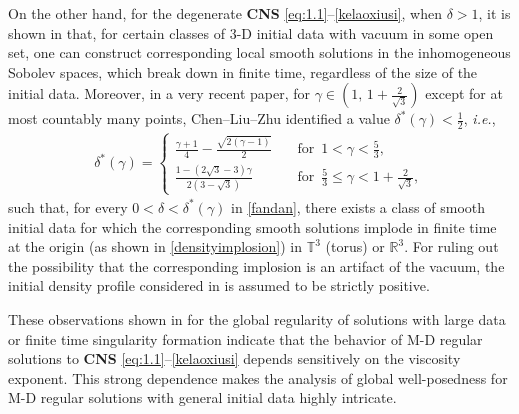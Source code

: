 \documentclass[11pt,reqno]{amsart}
\numberwithin{rk}{section}
\numberwithin{prop}{section}
\numberwithin{mydef}{section}
\numberwithin{lem}{section}
\numberwithin{equation}{section}
\numberwithin{thm}{section}
\begin{document}
On the other hand, for the degenerate \textbf{CNS} \eqref{eq:1.1}--\eqref{kelaoxiusi}, when $\delta>1$, it is shown in \cite{sz333} that,  for certain classes of 3-D initial data with vacuum in some open set, one can construct corresponding local smooth solutions in the inhomogeneous Sobolev spaces, which break down in finite time, regardless of the size of  the initial data. Moreover, in a very recent paper, for   $\gamma \in (1,\, 1+\frac{2}{\sqrt{3}})$ except for at most countably many points,  
Chen--Liu--Zhu \cite{GLZ}  identified  a value $\delta^*(\gamma)<\frac12$, \textit{i.e.},  
  \begin{equation}\label{def:delta*}
\begin{aligned}
\delta^*(\gamma)=\begin{cases}
\displaystyle
     \frac{\gamma+1}{4}-\frac{\sqrt{2(\gamma-1)}}{2}\quad &\displaystyle\text{for}\,\,\, 1 < \gamma <\frac{5}{3},\\[8pt]
     \displaystyle
     \frac{1-(2\sqrt{3}-3)\gamma}{2(3-\sqrt{3})}\quad &\displaystyle\text{for}\,\,\, \frac{5}{3} \leq \gamma <1+\frac{2}{\sqrt{3}},
\end{cases}
\end{aligned}
\end{equation}
such that, 
for every $0<\delta< \delta^*(\gamma)$ in \eqref{fandan}, 
there exists a class of smooth initial data for which the corresponding  smooth solutions 
 implode  in finite time at the origin (as shown in \eqref{densityimplosion}) in $\mathbb{T}^3$ (torus) or $\mathbb{R}^3$. 
For  ruling out 
the possibility that the corresponding implosion is an artifact of the vacuum, the  initial density profile considered in \cite{GLZ} is assumed to be  strictly positive.

These observations shown in \cite{buckmaster,shijia, GLZ,CZZ1,CZZ2,sz333, MPI,shao} for the global regularity of solutions with large data or finite time singularity formation indicate that the behavior   of   M-D  regular solutions to \textbf{CNS} \eqref{eq:1.1}--\eqref{kelaoxiusi} depends sensitively on the  viscosity exponent.
This strong dependence makes the analysis of global well-posedness for M-D regular solutions with general initial data highly intricate. 
\end{document}
